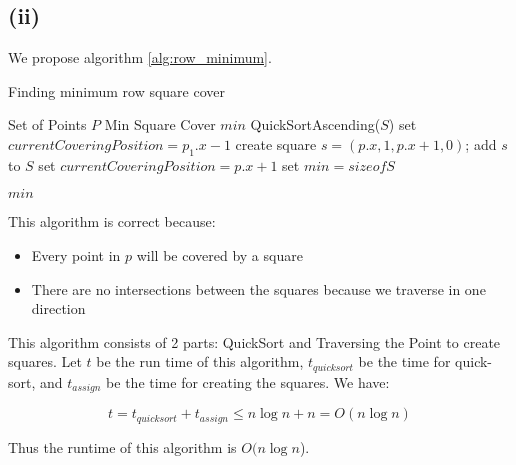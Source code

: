 \subsection*{(ii)}
\label{a-1-3-2}
We propose algorithm \ref{alg:row_minimum}.

\begin{algorithm}
  \caption{Finding minimum row square cover}
  \label{alg:row_minimum}
  \begin{algorithmic}
    \Require Set of Points $P$
    \Ensure Min Square Cover $min$
    \renewcommand{\algorithmicrequire}{\textbf{Input:}}
    \renewcommand{\algorithmicensure}{\textbf{Output:}}
    \algnewcommand{}
    \algnewcommand\Operation{\item[\algorithmicoperation]}
    \Operation
    \State QuickSortAscending($S$)
    \State set $currentCoveringPosition = p_1.x - 1$
    \State create square $s = (p.x, 1, p.x + 1, 0)$;
    \State add $s$ to $S$
    \State set $currentCoveringPosition = p.x + 1$
    \EndIf
    \State set $min = size of S$

    \Return $min$
    \EndFor
  \end{algorithmic}
\end{algorithm}

This algorithm is correct because:

\begin{itemize}
    \item Every point in $p$ will be covered by a square
    \item There are no intersections between the squares because we traverse in one direction
  \end{itemize}

  This algorithm consists of 2 parts: QuickSort and Traversing the Point to create squares. Let $t$ be the run time of this algorithm, $t_{quicksort}$ be the time for quick-sort, and $t_{assign}$ be the time for creating the squares. We have:

  \begin{equation}
    t = t_{quicksort} + t_{assign} \leq n\log n + n = O(n\log n)
  \end{equation}

  Thus the runtime of this algorithm is $O(n\log n$).
